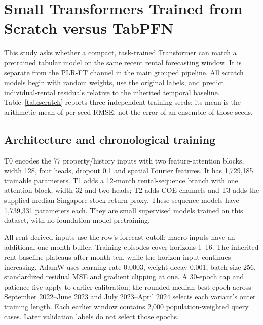 \documentclass[conference]{IEEEtran}
\begin{document}
\clearpage
\section{Small Transformers Trained from Scratch versus TabPFN}\label{app:scratch}
\begingroup\small
This study asks whether a compact, task-trained Transformer can match a pretrained tabular model on the same recent rental forecasting window. It is separate from the PLR-FT channel in the main grouped pipeline. All scratch models begin with random weights, use the original labels, and predict individual-rental residuals relative to the inherited temporal baseline. Table~\ref{tab:scratch} reports three independent training seeds; its mean is the arithmetic mean of per-seed RMSE, not the error of an ensemble of those seeds.

\subsection{Architecture and chronological training}
T0 encodes the 77 property/history inputs with two feature-attention blocks, width 128, four heads, dropout 0.1 and spatial Fourier features. It has 1,729,185 trainable parameters. T1 adds a 12-month rental-sequence branch with one attention block, width 32 and two heads; T2 adds COE channels and T3 adds the supplied median Singapore-stock-return proxy. These sequence models have 1,739,331 parameters each. They are small supervised models trained on this dataset, with no foundation-model pretraining.

All rent-derived inputs use the row's forecast cutoff; macro inputs have an additional one-month buffer. Training episodes cover horizons 1--16. The inherited rent baseline plateaus after month ten, while the horizon input continues increasing. AdamW uses learning rate 0.0003, weight decay 0.001, batch size 256, standardized residual MSE and gradient clipping at one. A 30-epoch cap and patience five apply to earlier calibration; the rounded median best epoch across September 2022--June 2023 and July 2023--April 2024 selects each variant's outer training length. Each earlier window contains 2,000 population-weighted query cases. Later validation labels do not select those epochs.

\begin{table}[!ht]
\caption{Scratch Transformer RMSE (SGD) on the same 28,995 June 2024--March 2025 rows. The last row blends independently trained T0/T1 predictions using a decay chosen on earlier data.}
\label{tab:scratch}
\centering\small

\end{table}
\end{document}
